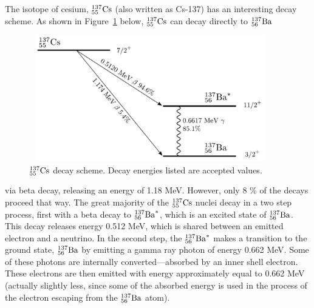 \documentclass{article}
\newcommand{\cs}{${}^{137}_{55}{\rm Cs}$ }
\begin{document}
\bigskip

The isotope of cesium,
\cs
(also written as Cs-137) has an interesting decay scheme.  As shown in
Figure~\ref{fig:csdecay} below, \cs can decay directly to
${}^{137}_{56}{\rm Ba}$
\begin{figure}
\begin{centering}
\includegraphics[width=4.1661in,height=2.1661in]{images/Cs-137-decay.pdf}
\caption{ \cs decay scheme.  Decay energies listed are accepted values. }
\label{fig:csdecay}
\end{centering}
\end{figure}
via beta decay, releasing an energy of 1.18 MeV.  However, only 8 \%
of the decays proceed that way.  The great majority of the \cs
nuclei decay in a two step process, first with a beta decay to ${}^{137}_{56}{\rm Ba}^*$,
which is an excited state of
${}^{137}_{56}{\rm Ba}$.
This decay releases energy 0.512 MeV, which is shared between an
emitted electron and a neutrino. In the second step, the ${}^{137}_{56}{\rm Ba}^*$ makes
a transition to the ground state, ${}^{137}_{56}{\rm Ba}$ by emitting a gamma ray photon
of energy 0.662 MeV.  Some of these photons are internally
converted---absorbed by an inner shell electron.  These electrons are
then emitted with energy approximately equal to 0.662 MeV
(actually slightly less, since some of the absorbed energy is used in
the process of the electron escaping from the ${}^{137}_{56}{\rm Ba}$ atom).
\end{document}
